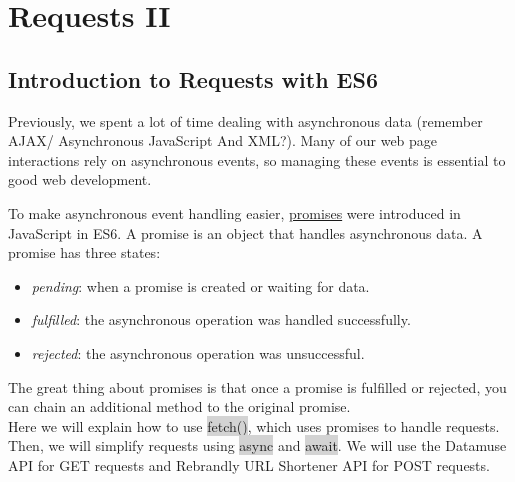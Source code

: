 \documentclass[11pt]{article}
\begin{document}
\newpage
\section{Requests II}
\subsection{Introduction to Requests with ES6}
Previously, we spent a lot of time dealing with asynchronous data (remember AJAX/ Asynchronous JavaScript And XML?). Many of our web page interactions rely on asynchronous events, so managing these events is essential to good web development.

To make asynchronous event handling easier, \href{https://developer.mozilla.org/en-US/docs/Web/JavaScript/Reference/Global_Objects/Promise}{promises} were introduced in JavaScript in ES6. A promise is an object that handles asynchronous data. A promise has three states: 
\begin{itemize}[leftmargin = *]
\item \textit{pending}: when a promise is created or waiting for data.
\item \textit{fulfilled}: the asynchronous operation was handled successfully.
\item \textit{rejected}: the asynchronous operation was unsuccessful.
\end{itemize}
The great thing about promises is that once a promise is fulfilled or rejected, you can chain an additional method to the original promise. \\
\newline
Here we will explain how to use \colorbox{lightgray}{fetch()}, which uses promises to handle requests. Then, we will simplify requests using \colorbox{lightgray}{async} and \colorbox{lightgray}{await}. We will use the Datamuse API for GET requests and Rebrandly URL Shortener API for POST requests. 
\end{document}
